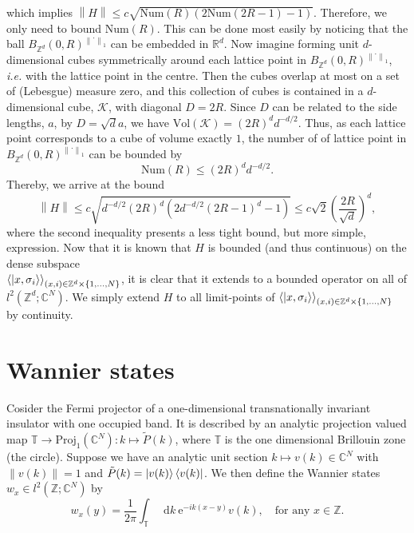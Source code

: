 \documentclass[a4paper,11pt]{article}
\newcommand{\euler}[1]{\text{e}^{#1}}
\newcommand{\norm}[1]{\left\lVert #1 \right\rVert}
\newcommand*\diff{\mathop{}\!\mathrm{d}}
\newcommand{\ie}{\emph{i.e.} }
\newcommand{\R}{\mathbb{R}}
\newcommand{\C}{\mathbb{C}}
\newcommand{\Z}{\mathbb{Z}}
\numberwithin{equation}{section}
\begin{document}
 	 which implies $ \norm{H}\leq c\sqrt{\text{Num}(R)(2\text{Num}(2R-1)-1)} $. Therefore, we only need to bound $ \text{Num}(R) $. This can be done most easily by noticing that the ball $ B_{\Z^d}(0,R)^{\norm{\cdot}_1} $ can be embedded in $ \R^d $. Now imagine forming unit $ d $-dimensional cubes symmetrically around each lattice point in $ B_{\Z^d}(0,R)^{\norm{\cdot}_1} $, \ie with the lattice point in the centre. Then the cubes overlap at most on a set of (Lebesgue) measure zero, and this collection of cubes is contained in a $ d $-dimensional cube, $ \mathcal{K} $, with diagonal $ D=2R $. Since $ D $ can be related to the side lengths, $ a $, by $ D=\sqrt{d}a $, we have $ \text{Vol}(\mathcal{K})=(2R)^d d^{-d/2} $. Thus, as each lattice point corresponds to a cube of volume exactly $ 1 $, the number of of lattice point in $ B_{\Z^d}(0,R)^{\norm{\cdot}_1} $ can be bounded by\begin{equation}
 	 \text{Num}(R)\leq(2R)^dd^{-d/2}.
 	 \end{equation}
 	 Thereby, we arrive at the bound\begin{equation}
 	 \norm{H}\leq c\sqrt{ d^{-d/2} (2R)^d \left(2 d^{-d/2} (2 R-1)^d-1\right)}\leq c\sqrt{2}\left(\frac{2R}{\sqrt{d}}\right)^d,
 	 \end{equation}
 	 where the second inequality presents a less tight bound, but more simple, expression.
 	 Now that it is known that $ H $ is bounded (and thus continuous) on the dense subspace\\ $ \braket{\ket{x,\sigma_i}}_{(x,i)\in\Z^d\times\{1,...,N\}} $, it is clear that it extends to a bounded operator on all of $ l^2(\Z^d;\C^N) $. We simply extend $ H $ to all limit-points of $ \braket{\ket{x,\sigma_i}}_{(x,i)\in\Z^d\times\{1,...,N\}} $ by continuity.
 	 
	\section{Wannier states}
	Cosider the Fermi projector of a one-dimensional transnationally invariant insulator with one occupied band. It is described by an analytic projection valued map $ \mathbb{T}\to \text{Proj}_1(\C^N): k\mapsto \tilde{P}(k) $, where $ \mathbb{T} $ is the one dimensional Brillouin zone (the circle).
	Suppose we have an analytic unit section $ k\mapsto v(k)\in \C^N $ with $ \norm{v(k)}=1 $ and $ \tilde{P}(k)=\ket{v(k)}\bra{v(k)} $. We then define the Wannier states $ w_x\in l^2(\Z;\C^N) $ by\begin{equation}
	w_x(y)=\frac{1}{2\pi}\int_{\mathbb{T}}\diff k\ \euler{-ik(x-y)}v(k),\quad\text{for any }x\in\Z.
	\end{equation}
\end{document}
